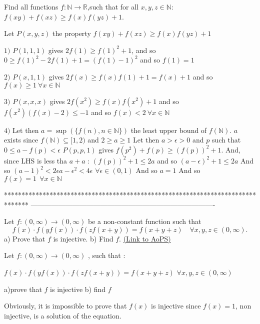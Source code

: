 \begin{mysolution}
	\begin{tcolorbox}Find all functions $ f: \mathbb{N}\rightarrow\mathbb{R}$,such that for all $ x,y,z\in\mathbb{N}$:
$ f(xy) + f(xz)\geq f(x)f(yz) + 1$.\end{tcolorbox}

Let $ P(x,y,z)$ the property $ f(xy) + f(xz)\geq f(x)f(yz) + 1$

$ 1)$ $ P(1,1,1)$ gives $ 2f(1)\geq f(1)^2+1$, and so $ 0\geq f(1)^2-2f(1)+1=(f(1)-1)^2$ and so $ \boxed{f(1)=1}$

$ 2)$ $ P(x,1,1)$ gives $ 2f(x)\geq f(x)f(1)+1=f(x)+1$ and so $ \boxed{f(x)\geq 1\: \forall x\in\mathbb{N}}$

$ 3)$ $ P(x,x,x)$ gives $ 2f(x^2)\geq f(x)f(x^2)+1$ and so $ f(x^2)(f(x)-2)\leq -1$ and so $ \boxed{f(x)<2\: \forall x\in\mathbb{N}}$

$ 4)$ Let then $ a=\sup(\{f(n),n\in\mathbb{N}\})$ the least upper bound of $ f(\mathbb{N})$. $ a$ exists since $ f(\mathbb{N})\subseteq[1,2)$ and $ 2\geq a\geq 1$
Let then $ a>\epsilon>0$ and $ p$ such that $ 0\leq a-f(p)<\epsilon$
$ P(p,p,1)$ gives $ f(p^2)+f(p)\geq (f(p))^2+1$. And, since LHS is less tha $ a+a$ : $ (f(p))^2+1 \leq 2a$ and so $ (a-\epsilon)^2+1\leq 2a$
And so $ (a-1)^2<2\epsilon a -\epsilon^2<4\epsilon$ $ \forall \epsilon\in(0,1)$
And so $ a=1$
And so $ \boxed{f(x)=1\: \: \forall x\in\mathbb{N}}$
\end{mysolution}
*******************************************************************************
-------------------------------------------------------------------------------

\begin{problem}
	Let $ f: (0,\infty) \rightarrow (0,\infty)$ be a non-constant function such that
\[ f(x)\cdot f(yf(x))\cdot f(zf(x + y)) = f(x + y + z)\quad \forall x,y,z \in (0 ,\infty).\]
a) Prove that $f$ is injective.
b) Find $f$.
	\flushright \href{https://artofproblemsolving.com/community/c6h172703}{(Link to AoPS)}
\end{problem}



\begin{mysolution}
	\begin{tcolorbox}Let $ f: (0,\infty) \rightarrow (0,\infty)$ ,  such that : 

$ f(x)\cdot f(yf(x))\cdot f(zf(x + y)) = f(x + y + z)$ $ \forall x,y,z \in (0 ,\infty)$ 

a)prove that $ f$ is injective 
b) find $ f$\end{tcolorbox}

Obviously, it is impossible to prove that $ f(x)$ is injective since $ f(x)=1$, non injective, is a solution of the equation.
\end{mysolution}



